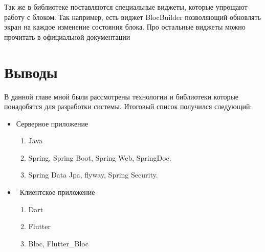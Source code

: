 Так же в библиотеке поставляются специальные виджеты, которые упрощают работу с блоком. Так например, есть виджет BlocBuilder позволяющий обновлять экран на каждое изменение состояния блока. Про остальные виджеты можно прочитать в официальной документации\cite{flutter_bloc}

\section{Выводы} \label{ch2:conclusion}

В данной главе мной были рассмотрены технологии и библиотеки которые понадобятся для разработки системы. Итоговый список получился следующий:

\begin{itemize} 
	\item Серверное приложение
	\begin{enumerate} 
		\item Java
		\item Spring, Spring Boot, Spring Web, SpringDoc.
		\item Spring Data Jpa, flyway, Spring Security.
	\end{enumerate} 
	\item Клиентское приложение
	\begin{enumerate} 
		\item Dart
		\item Flutter
		\item Bloc, Flutter\_Bloc
	\end{enumerate} 
\end{itemize}

\newpage